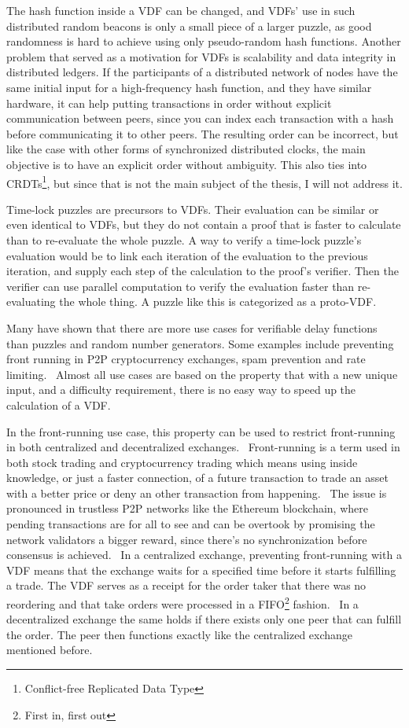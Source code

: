 The hash function inside a VDF can be changed, and VDFs' use in such distributed random beacons is only a small piece of a larger puzzle, as good randomness is hard to achieve using only pseudo-random hash functions. Another problem that served as a motivation for VDFs is scalability and data integrity in distributed ledgers. If the participants of a distributed network of nodes have the same initial input for a high-frequency hash function, and they have similar hardware, it can help putting transactions in order without explicit communication between peers, since you can index each transaction with a hash before communicating it to other peers. The resulting order can be incorrect, but like the case with other forms of synchronized distributed clocks, the main objective is to have an explicit order without ambiguity. This also ties into CRDTs\footnote{Conflict-free Replicated Data Type}, but since that is not the main subject of the thesis, I will not address it.

Time-lock puzzles are precursors to VDFs. Their evaluation can be similar or even identical to VDFs, but they do not contain a proof that is faster to calculate than to re-evaluate the whole puzzle. A way to verify a time-lock puzzle's evaluation would be to link each iteration of the evaluation to the previous iteration, and supply each step of the calculation to the proof's verifier. Then the verifier can use parallel computation to verify the evaluation faster than re-evaluating the whole thing. A puzzle like this is categorized as a proto-VDF.

Many have shown that there are more use cases for verifiable delay functions than puzzles and random number generators. Some examples include preventing front running in P2P cryptocurrency exchanges, spam prevention and rate limiting.~\cite{noauthor_undated-hk} Almost all use cases are based on the property that with a new unique input, and a difficulty requirement, there is no easy way to speed up the calculation of a VDF.

In the front-running use case, this property can be used to restrict front-running in both centralized and decentralized exchanges.~\cite{Khalil2019-sl} Front-running is a term used in both stock trading and cryptocurrency trading which means using inside knowledge, or just a faster connection, of a future transaction to trade an asset with a better price or deny an other transaction from happening.~\cite{Robinson2020-ve} The issue is pronounced in trustless P2P networks like the Ethereum blockchain, where pending transactions are for all to see and can be overtook by promising the network validators a bigger reward, since there's no synchronization before consensus is achieved.~\cite{Mitchell2020-hn} In a centralized exchange, preventing front-running with a VDF means that the exchange waits for a specified time before it starts fulfilling a trade. The VDF serves as a receipt for the order taker that there was no reordering and that take orders were processed in a FIFO\footnote{First in, first out} fashion.~\cite{Cline2020-wb} In a decentralized exchange the same holds if there exists only one peer that can fulfill the order. The peer then functions exactly like the centralized exchange mentioned before.

